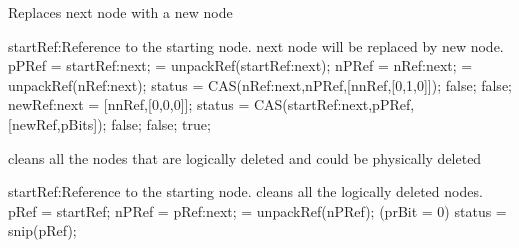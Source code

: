 \documentclass[11pt,onecolumn]{IEEEtran}
\begin{document}
\begin{algorithm}
  \caption{Replaces next node with a new node}
  \label{alg:replace}
  
  \begin{algorithmic}[1]
    \Require
        \Statex startRef:Reference to the starting node.
    \Ensure
       \Statex next node will be replaced by new node.
    \Statex   
      \State pPRef = startRef:next;    
       = unpackRef(startRef:next);
      \If{([pBits] = [0,0,0])}
        \State nPRef = nRef:next;    
         = unpackRef(nRef:next);
          \State status = CAS(nRef:next,nPRef,[nnRef,[0,1,0]]);
            \State
            \Return false;
          \EndIf  
        \Else
          \State
          \Return false;
        \EndIf
        \State newRef:next = [nnRef,[0,0,0]];
        \State status = CAS(startRef:next,pPRef,[newRef,pBits]);
          \State
          \Return false;
        \EndIf
      \Else
        \State
        \Return false;
      \EndIf
      \State
      \Return true;
    \EndFunction
  \end{algorithmic}
\end{algorithm}

\begin{algorithm}
  \caption{cleans all the nodes that are logically deleted and could be physically deleted}
  \label{alg:clean}
  \begin{algorithmic}[1]
    \Require
        \Statex startRef:Reference to the starting node.
    \Ensure
       \Statex cleans all the logically deleted nodes.
    \Statex   
      \State pRef  = startRef;
        \State nPRef = pRef:next;
         = unpackRef(nPRef);
        \If({prBit = 0})
          \State status = snip(pRef);
        \Else
          \State   
        \EndIf
      \EndWhile
    \EndFunction
  \end{algorithmic}
\end{algorithm}
\end{document}
